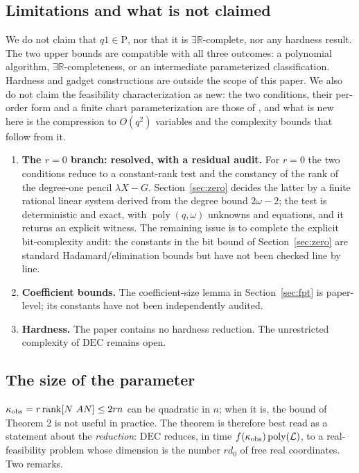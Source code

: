 \documentclass[journal]{IEEEtran}
\theoremstyle{plainn}
\begin{document}
\subsection{Limitations and what is not claimed}\label{sec:limits}
We do not claim that $q1\in\mathrm P$, nor that it is $\exists\mathbb R$-complete, nor any hardness result. The two upper bounds are compatible with all three outcomes: a polynomial algorithm, $\exists\mathbb R$-completeness, or an intermediate parameterized classification. Hardness and gadget constructions are outside the scope of this paper. We also do not claim the feasibility characterization as new: the two conditions, their per-order form and a finite chart parameterization are those of \cite{fer10,dar25,fer26a,fer26b}, and what is new here is the compression to $O(q^2)$ variables and the complexity bounds that follow from it.
\begin{enumerate}
\item \textbf{The $r=0$ branch: resolved, with a residual audit.} For $r=0$ the two conditions reduce to a constant-rank test and the constancy of the rank of the degree-one pencil $\lambda X-G$. Section~\ref{sec:zero} decides the latter by a finite rational linear system derived from the degree bound $2\omega-2$; the test is deterministic and exact, with $\operatorname{poly}(q,\omega)$ unknowns and equations, and it returns an explicit witness. The remaining issue is to complete the explicit bit-complexity audit: the constants in the bit bound of Section~\ref{sec:zero} are standard Hadamard/elimination bounds but have not been checked line by line.
\item \textbf{Coefficient bounds.} The coefficient-size lemma in Section~\ref{sec:fpt} is paper-level; its constants have not been independently audited.
\item \textbf{Hardness.} The paper contains no hardness reduction. The unrestricted complexity of $\mathrm{DEC}$ remains open.
\end{enumerate}
\subsection{The size of the parameter}\label{sec:paramsize}
$\kappa_{\rm obs}=r\operatorname{rank}[N\ AN]\le 2rn$ can be quadratic in $n$; when it is, the bound of Theorem 2 is not useful in practice. The theorem is therefore best read as a statement about the \emph{reduction}: $\mathrm{DEC}$ reduces, in time $f(\kappa_{\rm obs})\operatorname{poly}(\mathcal L)$, to a real-feasibility problem whose dimension is the number $rd_0$ of free real coordinates. Two remarks.
\end{document}
